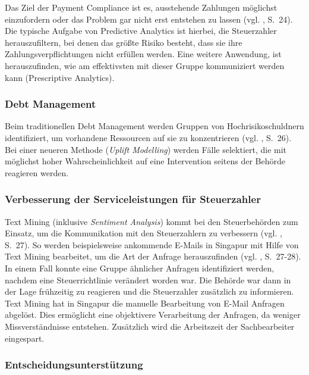 Das Ziel der Payment Compliance ist es, ausstehende Zahlungen möglichst einzufordern oder das Problem gar nicht erst
entstehen zu lassen (vgl. \cite{OECD}, S.~24). Die typische Aufgabe von Predictive Analytics ist hierbei, die
Steuerzahler herauszufiltern, bei denen das größte Risiko besteht, dass sie ihre Zahlungsverpflichtungen nicht erfüllen werden. 
Eine weitere Anwendung, ist herauszufinden, wie am effektivsten mit dieser Gruppe kommuniziert werden kann (Prescriptive Analytics).

\subsubsection{Debt Management}

Beim traditionellen Debt Management werden Gruppen von Hochrisikoschuldnern identifiziert, um vorhandene Ressourcen auf sie zu
konzentrieren (vgl. \cite{OECD}, S.~26). Bei einer neueren Methode (\emph{Uplift Modelling}) werden Fälle selektiert, die
mit möglichst hoher Wahrscheinlichkeit auf eine Intervention seitens der Behörde reagieren werden. 

\subsubsection{Verbesserung der Serviceleistungen für Steuerzahler}

Text Mining (inklusive \emph{Sentiment Analysis}) kommt bei den Steuerbehörden zum Einsatz, um die Kommunikation mit den
Steuerzahlern zu verbessern (vgl. \cite{OECD}, S.~27). So werden beispielsweise ankommende E-Mails in Singapur mit Hilfe
von Text Mining bearbeitet, um die Art der Anfrage herauszufinden (vgl. \cite{OECD}, S.~27-28). In einem Fall konnte eine
Gruppe ähnlicher Anfragen identifiziert werden, nachdem eine Steuerrichtlinie verändert worden war. Die Behörde war dann in
der Lage frühzeitig zu reagieren und die Steuerzahler zusätzlich zu informieren. Text Mining hat in Singapur die manuelle
Bearbeitung von E-Mail Anfragen abgelöst. Dies ermöglicht eine objektivere Verarbeitung der Anfragen, da weniger Missverständnisse
entstehen. Zusätzlich wird die Arbeitszeit der Sachbearbeiter eingespart.

\subsubsection{Entscheidungsunterstützung}

